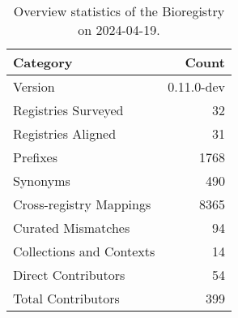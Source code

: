\begin{table}
\caption{Overview statistics of the Bioregistry on 2024-04-19.}
\label{tab:bioregistry-summary}
\begin{tabular}{lr}
\toprule
Category & Count \\
\midrule
Version & 0.11.0-dev \\
Registries Surveyed & 32 \\
Registries Aligned & 31 \\
Prefixes & 1768 \\
Synonyms & 490 \\
Cross-registry Mappings & 8365 \\
Curated Mismatches & 94 \\
Collections and Contexts & 14 \\
Direct Contributors & 54 \\
Total Contributors & 399 \\
\bottomrule
\end{tabular}
\end{table}
